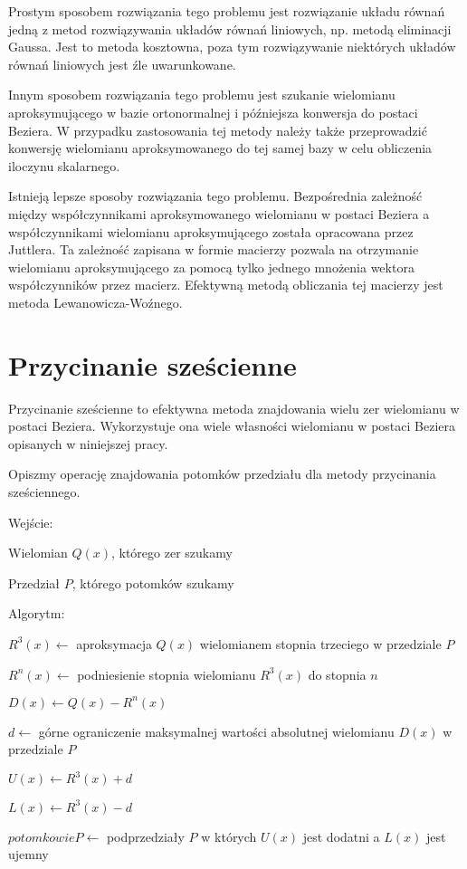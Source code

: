 \documentclass{article}
\begin{document}
Prostym sposobem rozwiązania tego problemu jest rozwiązanie układu równań jedną z metod rozwiązywania układów równań liniowych, np. metodą eliminacji Gaussa. Jest to metoda kosztowna, poza tym rozwiązywanie niektórych układów równań liniowych jest źle uwarunkowane.

Innym sposobem rozwiązania tego problemu jest szukanie wielomianu aproksymującego w bazie ortonormalnej i późniejsza konwersja do postaci Beziera. W przypadku zastosowania tej metody należy także przeprowadzić konwersję wielomianu aproksymowanego do tej samej bazy w celu obliczenia iloczynu skalarnego.

Istnieją lepsze sposoby rozwiązania tego problemu. Bezpośrednia zależność między współczynnikami aproksymowanego wielomianu w postaci Beziera a współczynnikami wielomianu aproksymującego została opracowana przez Juttlera. Ta zależność zapisana w formie macierzy pozwala na otrzymanie wielomianu aproksymującego za pomocą tylko jednego mnożenia wektora współczynników przez macierz. Efektywną metodą obliczania tej macierzy jest metoda Lewanowicza-Woźnego.

\section{Przycinanie sześcienne}

Przycinanie sześcienne to efektywna metoda znajdowania wielu zer wielomianu w postaci Beziera. Wykorzystuje ona wiele własności wielomianu w postaci Beziera opisanych w niniejszej pracy.

Opiszmy operację znajdowania potomków przedziału dla metody przycinania sześciennego.

Wejście:

Wielomian $Q(x)$, którego zer szukamy

Przedział $P$, którego potomków szukamy

Algorytm:

$R^3(x) \leftarrow$ aproksymacja $Q(x)$ wielomianem stopnia trzeciego w przedziale $P$

$R^n(x) \leftarrow$ podniesienie stopnia wielomianu $R^3(x)$ do stopnia $n$

$D(x) \leftarrow Q(x) - R^n(x)$

$d \leftarrow$ górne ograniczenie maksymalnej wartości absolutnej wielomianu $D(x)$ w przedziale $P$

$U(x) \leftarrow R^3(x) + d$

$L(x) \leftarrow R^3(x) - d$

$potomkowie P \leftarrow$ podprzedziały $P$ w których $U(x)$ jest dodatni a $L(x)$ jest ujemny
\end{document}
